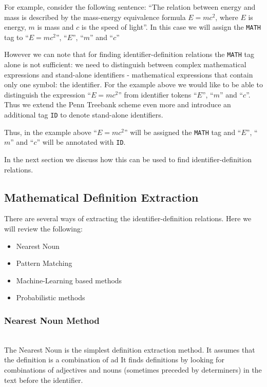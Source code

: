 For example, consider the following sentence:
``The relation between energy and mass is
described by  the mass-energy equivalence formula $E = mc^2$,
where $E$ is energy, $m$ is mass and $c$ is the speed of light''.
In this case we will assign the \verb|MATH| tag to ``$E = mc^2$'', ``$E$'',
``$m$'' and ``$c$''

However we can note that for finding identifier-definition relations
the \texttt{MATH} tag alone is not sufficient: we need to distinguish
between complex mathematical expressions and stand-alone identifiers -
mathematical expressions that contain only one symbol: the identifier.
For the example above we would like to be able to distinguish the
expression ``$E = mc^2$'' from identifier tokens ``$E$'',
``$m$'' and ``$c$''. Thus we extend the Penn Treebank scheme even more
and introduce an additional tag \texttt{ID} to denote stand-alone identifiers.


Thus, in the example above ``$E = mc^2$'' will be assigned the \texttt{MATH} tag
and ``$E$'', ``$m$'' and ``$c$'' will be annotated with \texttt{ID}.

In the next section we discuss how this can be used to find identifier-definition
relations.


\subsection{Mathematical Definition Extraction} \label{sec:definition-extraction-methods}
There are several ways of extracting the identifier-definition relations.
Here we will review the following:

\begin{itemize}
\itemsep1pt\parskip0pt
  \item Nearest Noun
  \item Pattern Matching
  \item Machine-Learning based methods
  \item Probabilistic methods
\end{itemize}


\subsubsection{Nearest Noun Method}

\ \\

The Nearest Noun  \cite{grigore2009towards} \cite{yokoi2011contextual}
is the simplest definition extraction method.
It assumes that the definition is a combination of ad
It finds definitions by looking for combinations of adjectives and nouns
(sometimes preceded by determiners) in the text before the identifier.

